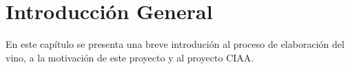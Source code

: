 
\chapter{Introducción General} %

\label{Chapter1} %
\label{IntroGeneral}

En este capítulo se presenta una breve introdución al proceso de elaboración del vino,  a la motivación de este proyecto y al proyecto CIAA. 


\newcommand{\keyword}[1]{\textbf{#1}}
\newcommand{\tabhead}[1]{\textbf{#1}}
\newcommand{\code}[1]{\texttt{#1}}
\newcommand{\file}[1]{\texttt{\bfseries#1}}
\newcommand{\option}[1]{\texttt{\itshape#1}}
\newcommand{\grados}{$^{\circ}$}


